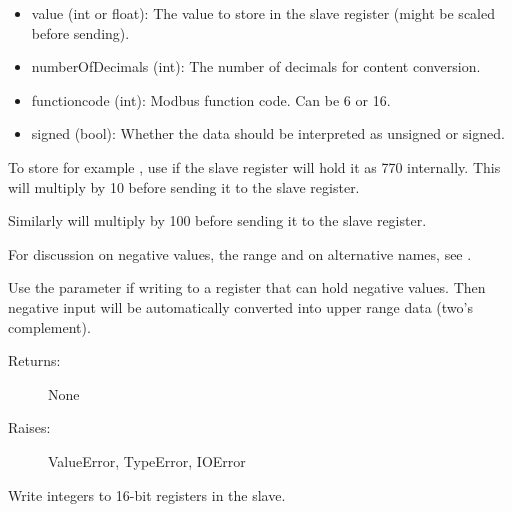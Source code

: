 \documentclass[letterpaper,10pt,english]{sphinxmanual}
\begin{document}
\begin{fulllineitems}
\begin{fulllineitems}
\begin{description}
\begin{itemize}
\item {} 
value (int or float): The value to store in the slave register (might be scaled before sending).

\item {} 
numberOfDecimals (int): The number of decimals for content conversion.

\item {} 
functioncode (int): Modbus function code. Can be 6 or 16.

\item {} 
signed (bool): Whether the data should be interpreted as unsigned or signed.

\end{itemize}

\end{description}

To store for example , use  if the slave register will hold it as 770 internally.
This will multiply  by 10 before sending it to the slave register.

Similarly  will multiply  by 100 before sending it to the slave register.

For discussion on negative values, the range and on alternative names, see {\hyperref[minimalmodbus:minimalmodbus.Instrument.read_register]{}}.

Use the parameter  if writing to a register that can hold
negative values. Then negative input will be automatically converted into
upper range data (two's complement).
\begin{description}
\item[{Returns:}] \leavevmode
None

\item[{Raises:}] \leavevmode
ValueError, TypeError, IOError

\end{description}

\end{fulllineitems}


\begin{fulllineitems}
\label{minimalmodbus:minimalmodbus.Instrument.write_registers}
Write integers to 16-bit registers in the slave.


\end{fulllineitems}
\end{fulllineitems}
\end{document}
